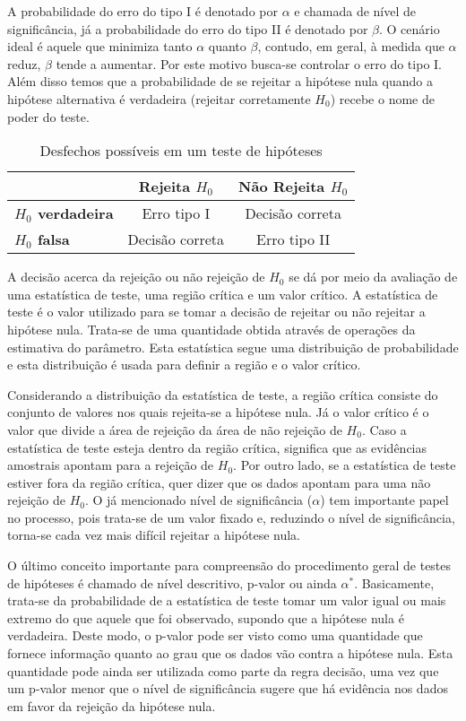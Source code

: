 A probabilidade do erro do tipo I é denotado por $\alpha$ e chamada de nível de significância, já a probabilidade do erro do tipo II é denotado por $\beta$. O cenário ideal é aquele que minimiza tanto $\alpha$ quanto $\beta$, contudo, em geral, à medida que $\alpha$ reduz, $\beta$ tende a aumentar. Por este motivo busca-se controlar o erro do tipo I. Além disso temos que a probabilidade de se rejeitar a hipótese nula quando a hipótese alternativa é verdadeira (rejeitar corretamente $H_0$) recebe o nome de poder do teste.

\begin{table}[h]
\centering
\begin{tabular}{l|cc}
\hline
\multicolumn{1}{c|}{}    & \textbf{Rejeita $H_0$} & \textbf{Não Rejeita $H_0$} \\ \hline
\textbf{$H_0$ verdadeira} & Erro tipo I           & Decisão correta           \\
\textbf{$H_0$ falsa}      & Decisão correta       & Erro tipo II              \\ \hline
\end{tabular}
\caption{Desfechos possíveis em um teste de hipóteses}
\label{tab:desfechos}
\end{table}

A decisão acerca da rejeição ou não rejeição de $H_0$ se dá por meio da avaliação de uma estatística de teste, uma região crítica e um valor crítico. A estatística de teste é o valor utilizado para se tomar a decisão de rejeitar ou não rejeitar a hipótese nula. Trata-se de uma quantidade obtida através de operações da estimativa do parâmetro. Esta estatística segue uma distribuição de probabilidade e esta distribuição é usada para definir a região e o valor crítico.

Considerando a distribuição da estatística de teste, a região crítica consiste do conjunto de valores nos quais rejeita-se a hipótese nula. Já o valor crítico é o valor que divide a área de rejeição da área de não rejeição de $H_0$. Caso a estatística de teste esteja dentro da região crítica, significa que as evidências amostrais apontam para a rejeição de $H_0$. Por outro lado, se a estatística de teste estiver fora da região crítica, quer dizer que os dados apontam para uma não rejeição de $H_0$. O já mencionado nível de significância ($\alpha$) tem importante papel no processo, pois trata-se de um valor fixado e, reduzindo o nível de significância, torna-se cada vez mais difícil rejeitar a hipótese nula.

O último conceito importante para compreensão do procedimento geral de  testes de hipóteses é chamado de nível descritivo, p-valor ou ainda $\alpha^*$. Basicamente, trata-se da probabilidade de a estatística de teste tomar um valor igual ou mais extremo do que aquele que foi observado, supondo que a hipótese nula é verdadeira. Deste modo, o p-valor pode ser visto como uma quantidade que fornece informação quanto ao grau que os dados vão contra a hipótese nula. Esta quantidade pode ainda ser utilizada como parte da regra decisão, uma vez que um p-valor menor que o nível de significância sugere que há evidência nos dados em favor da rejeição da hipótese nula.

